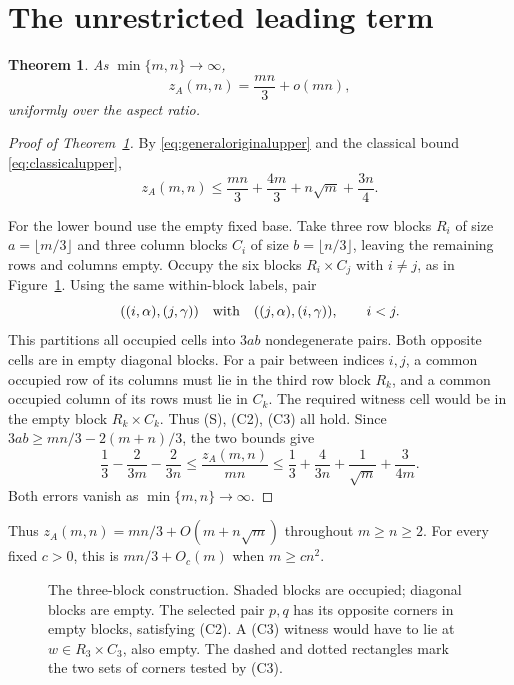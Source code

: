 \documentclass[11pt]{article}
\newtheorem{theorem}{Theorem}
\newcommand{\za}{z_A}
\begin{document}
\section{The unrestricted leading term}\label{sec:unrestricted}
\begin{theorem}\label{thm:unrestricted}
As $\min\{m,n\}\to\infty$,
\[
 \za(m,n)=\frac{mn}{3}+o(mn),
\]
uniformly over the aspect ratio.
\end{theorem}
\begin{proof}[Proof of Theorem~\ref{thm:unrestricted}]
By \eqref{eq:generaloriginalupper} and the classical bound
\eqref{eq:classicalupper},
\[
 \za(m,n)\le\frac{mn}{3}+\frac{4m}{3}+n\sqrt m+\frac{3n}{4}.
\]

For the lower bound use the empty fixed base. Take three row blocks
$R_i$ of size $a=\lfloor m/3\rfloor$ and three column blocks $C_i$
of size $b=\lfloor n/3\rfloor$, leaving the remaining rows and columns
empty. Occupy the six blocks $R_i\times C_j$ with $i\ne j$, as in
Figure~\ref{fig:threeblocks}.
Using the same within-block labels, pair
\[
 ((i,\alpha),(j,\gamma))\quad\hbox{with}\quad
 ((j,\alpha),(i,\gamma)),\qquad i<j.
\]
This partitions all occupied cells into $3ab$ nondegenerate pairs.
Both opposite cells are in empty diagonal blocks.
For a pair between indices $i,j$, a common occupied row of its columns
must lie in the third row block $R_k$, and a common occupied column of
its rows must lie in $C_k$. The required witness cell would be in the
empty block $R_k\times C_k$. Thus \textup{(S), (C2), (C3)} all hold.
Since $3ab\ge mn/3-2(m+n)/3$, the two bounds give
\[
 \frac13-\frac{2}{3m}-\frac{2}{3n}
 \le\frac{\za(m,n)}{mn}
 \le\frac13+\frac{4}{3n}+\frac1{\sqrt m}+\frac{3}{4m}.
\]
Both errors vanish as $\min\{m,n\}\to\infty$.
\end{proof}

Thus $\za(m,n)=mn/3+O(m+n\sqrt m)$ throughout $m\ge n\ge2$.
For every fixed $c>0$, this is $mn/3+O_c(m)$ when $m\ge cn^2$.
\begin{figure}[htbp]
\centering
{}
\caption{The three-block construction. Shaded blocks are occupied;
diagonal blocks are empty. The selected pair $p,q$ has its opposite
corners in empty blocks, satisfying (C2). A (C3) witness would have to
lie at $w\in R_3\times C_3$, also empty. The dashed and dotted
rectangles mark the two sets of corners tested by (C3).}
\label{fig:threeblocks}
\end{figure}
\end{document}
